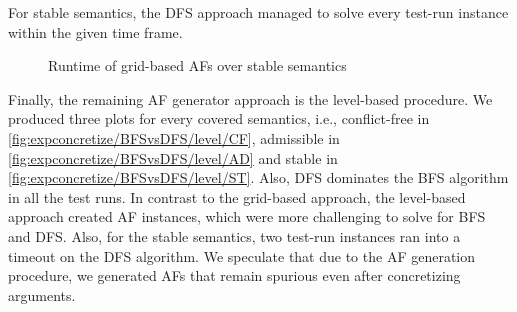 For stable semantics, the DFS approach managed to solve every test-run instance within the given time frame.

\begin{figure}[H]
    \centering
    \caption{Runtime of grid-based AFs over stable semantics}
    \label{fig:expconcretize/BFSvsDFS/grid/ST}
\end{figure}





Finally, the remaining AF generator approach is the level-based procedure. We produced three plots for every covered semantics, i.e., conflict-free in \cref{fig:expconcretize/BFSvsDFS/level/CF}, admissible in \cref{fig:expconcretize/BFSvsDFS/level/AD} and stable in \cref{fig:expconcretize/BFSvsDFS/level/ST}. Also, DFS dominates the BFS algorithm in all the test runs. In contrast to the grid-based approach, the level-based approach created AF instances, which were more challenging to solve for BFS and DFS. Also, for the stable semantics, two test-run instances ran into a timeout on the DFS algorithm. We speculate that due to the AF generation procedure, we generated AFs that remain spurious even after concretizing arguments.

